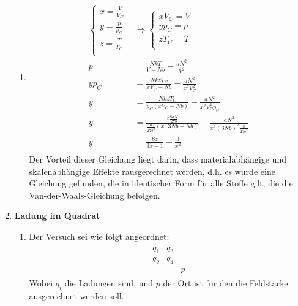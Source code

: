 \documentclass[11pt,letterpaper]{article}
\begin{document}
\begin{enumerate}
\begin{enumerate}
            \item
            \begin{align*}
                \begin{cases}
                    x = \frac{V}{V_C}\\
                    y = \frac{p}{p_C}\\
                    z = \frac{T}{T_C}\\
                \end{cases} &\Longrightarrow
                \begin{cases}
                    x V_C = V\\
                    y p_C = p\\
                    z T_C = T\\
                \end{cases}\\
                p &= \frac{N k T}{V - N b} - \frac{a N^2}{V^2}\\
                y p_C &= \frac{N k z T_C}{x V_C - N b} - \frac{a N^2}{x^2 V_C^2}\\
                y &= \frac{N k z T_C}{ p_C (x V_C - N b)} - \frac{a N^2}{x^2 V_C^2 p_C}\\
                y &= \frac{z \frac{8 a N}{27 b}}{ \frac{a}{27 b^2} (x \cdot3 N b - N b)} - \frac{a N^2}{x^2 (3 N b)^2 \frac{a}{27 b^2}}\\
                y &= \frac{8 z}{3x - 1} - \frac{3}{x^2}\\
            \end{align*}
            Der Vorteil dieser Gleichung liegt darin, dass materialabhängige und skalenabhängige Effekte rausgerechnet werden, 
            d.h. es wurde eine Gleichung gefunden, die in identischer Form für alle Stoffe gilt,
            die die Van-der-Waals-Gleichung befolgen.
        \end{enumerate}
    
    
    \item \textbf{Ladung im Quadrat}
        \begin{enumerate}
            \item 
            Der Versuch sei wie folgt angeordnet:
            \begin{align*}
                \begin{array}{ccc}
                    q_1 & q_3 &\\
                    q_2 & q_4 &\\
                    &&p
                \end{array}
            \end{align*}
            Wobei $q_i$ die Ladungen sind, und $p$ der Ort ist für den die Feldstärke
            ausgerechnet werden soll. 


\end{enumerate}
\end{enumerate}
\end{document}
